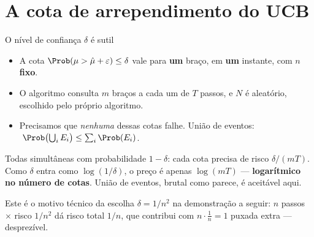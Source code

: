\documentclass[aspectratio=169, 10pt]{beamer}
\newcommand{\muhat}{\hat{\mu}}
\newcommand{\Nc}{N}                         %
\begin{document}
\section{A cota de arrependimento do UCB}

\begin{frame}{O nível de confiança $\delta$ é sutil}
  \begin{itemize}
    \item A cota $\Prob(\mu > \muhat + \varepsilon) \le \delta$ vale para
          \textbf{um} braço, em \textbf{um} instante, com $n$ \textbf{fixo}.
    \item O algoritmo consulta $m$ braços a cada um de $T$ passos, e $\Nc$
          é aleatório, escolhido pelo próprio algoritmo.
    \item Precisamos que \emph{nenhuma} dessas cotas falhe. União de
          eventos:
          $\;\Prob\bigl(\bigcup_i E_i\bigr) \le \sum_i \Prob(E_i)$.
  \end{itemize}

  \begin{alertabox}
    Todas simultâneas com probabilidade $1 - \delta$: cada cota precisa de
    risco $\delta/(mT)$. Como $\delta$ entra como $\log(1/\delta)$, o
    preço é apenas $\log(mT)$ --- \textbf{logarítmico no número de cotas}.
    União de eventos, brutal como parece, é aceitável aqui.
  \end{alertabox}

  \begin{ideiabox}
    Este é o motivo técnico da escolha $\delta = 1/n^2$ na demonstração a
    seguir: $n$ passos $\times$ risco $1/n^2$ dá risco total $1/n$, que
    contribui com $n \cdot \frac1n = 1$ puxada extra --- desprezível.
  \end{ideiabox}
\end{frame}
\end{document}
